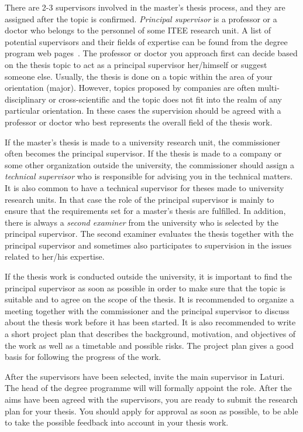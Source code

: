 There are 2-3 supervisors involved in the master’s thesis process, and they are assigned after the topic is confirmed. \textit{Principal supervisor} is a professor or a  doctor who belongs to the personnel of some ITEE research unit. A list of potential supervisors and their fields of expertise can be found from the degree program web pages~\cite{mscstudies}. The professor or doctor you approach first can decide based on  the thesis topic to act as a principal supervisor her/himself or suggest someone else.  Usually, the thesis is done on a topic within the area of your orientation (major).  However, topics proposed by companies are often multi-disciplinary or cross-scientific  and the topic does not fit into the realm of any particular orientation. In these cases  the supervision should be agreed with a professor or doctor who best represents the  overall field of the thesis work.

If the master’s thesis is made to a university research unit, the commissioner often becomes the principal supervisor. If the thesis is made to a company or some other organization outside the university, the commissioner should assign a \textit{technical supervisor} who is responsible for advising you in the technical matters. It is also common to have a technical supervisor for theses made to university research units. In that case the role of the principal supervisor is mainly to ensure that the requirements set for a master’s thesis are fulfilled. In addition, there is always a \textit{second examiner} from the university who is selected by the principal supervisor. The second examiner evaluates the thesis together with the principal supervisor and sometimes also participates to supervision in the issues related to her/his expertise.

If the thesis work is conducted outside the university, it is important to find the principal supervisor as soon as possible in order to make sure that the topic is suitable and to agree on the scope of the thesis. It is recommended to organize a meeting together with the commissioner and the principal supervisor to discuss about the thesis work before it has been started. It is also recommended to write a short project plan that describes the background, motivation, and objectives of the work as well as a timetable and possible risks. The project plan gives a good basis for following the progress of the work.

After the supervisors have been selected, invite the main supervisor in Laturi. The head of the degree programme will will formally appoint the role. After the aims have been agreed with the supervisors, you are ready to submit the research plan for your thesis.  You should apply for approval as soon as possible, to be able to take the possible feedback into account in your thesis work. 

